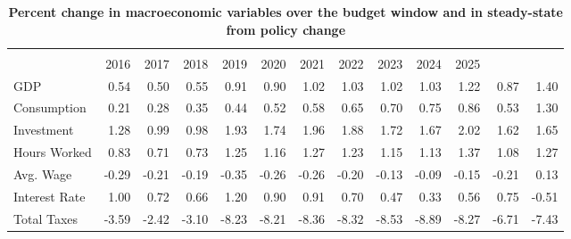 \documentclass[letterpaper,12pt]{article}
\theoremstyle{definition}
\begin{document}
\begin{spacing}{1.5}{}
  \begin{table}[htbp] \centering \captionsetup{width=5.8in}
    \caption{\label{TabTable1}\textbf{Percent change in macroeconomic variables over the budget window and in steady-state from policy change}}
      \begin{threeparttable}
      \begin{tabular}{>{\scriptsize}l |>{\scriptsize}r >{\scriptsize}r >{\scriptsize}r >{\scriptsize}r >{\scriptsize}r >{\scriptsize}r >{\scriptsize}r >{\scriptsize}r >{\scriptsize}r >{\scriptsize}r |>{\scriptsize}r >{\scriptsize}r}
      \hline\hline
      \multicolumn{1}{c}{\scriptsize{Macroeconomic}} & & & & & & & & & & & \multicolumn{1}{c}{\scriptsize{2016-}} & \\[-2mm]
      \multicolumn{1}{c}{\scriptsize{variables}} & 2016  & 2017  & 2018  & 2019  & 2020  & 2021  & 2022  & 2023  & 2024  & 2025 & \multicolumn{1}{c}{\scriptsize{2025}} & \multicolumn{1}{c}{\scriptsize{SS}} \\
      \hline
      GDP & 0.54  & 0.50  & 0.55  & 0.91  & 0.90  & 1.02  & 1.03  & 1.02  & 1.03  & 1.22  & 0.87  & 1.40 \\
      Consumption & 0.21  & 0.28  & 0.35  & 0.44  & 0.52  & 0.58  & 0.65  & 0.70  & 0.75  & 0.86  & 0.53  & 1.30 \\
      Investment & 1.28  & 0.99  & 0.98  & 1.93  & 1.74  & 1.96  & 1.88  & 1.72  & 1.67  & 2.02  & 1.62  & 1.65 \\
      Hours Worked & 0.83  & 0.71  & 0.73  & 1.25  & 1.16  & 1.27  & 1.23  & 1.15  & 1.13  & 1.37  & 1.08  & 1.27 \\
      \hline
      Avg. Wage & -0.29 & -0.21 & -0.19 & -0.35 & -0.26 & -0.26 & -0.20 & -0.13 & -0.09 & -0.15 & -0.21 & 0.13 \\
      Interest Rate & 1.00  & 0.72  & 0.66  & 1.20  & 0.90  & 0.91  & 0.70  & 0.47  & 0.33  & 0.56 & 0.75  & -0.51 \\
      \hline
      Total Taxes & -3.59 & -2.42 & -3.10 & -8.23 & -8.21 & -8.36 & -8.32 & -8.53 & -8.89 & -8.27 & -6.71 & -7.43 \\
      \hline\hline
    \end{tabular}
    \end{threeparttable}
  \end{table}


\end{spacing}
\end{document}
